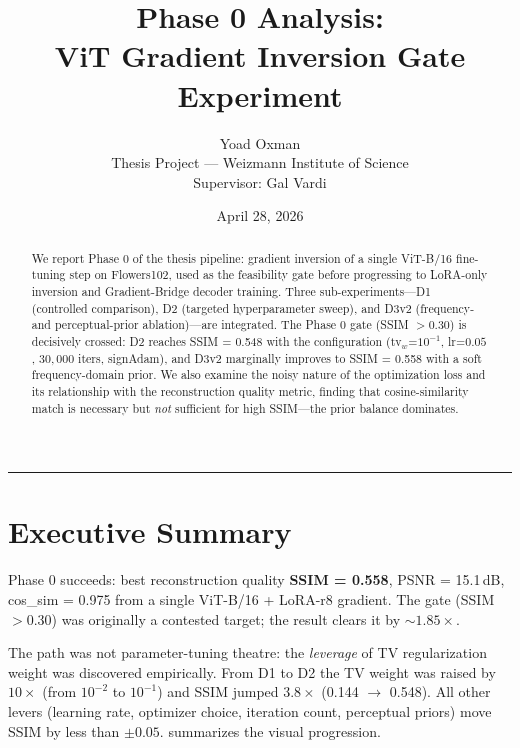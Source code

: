 \documentclass[11pt,a4paper]{article}
\title{\color{accent}\bfseries Phase 0 Analysis:\\ ViT Gradient Inversion Gate Experiment}
\author{Yoad Oxman\\\small Thesis Project --- Weizmann Institute of Science\\\small Supervisor: Gal Vardi}
\date{April 28, 2026}
\begin{document}
\maketitle

\begin{abstract}
\noindent We report Phase 0 of the thesis pipeline: gradient inversion of a single ViT-B/16 fine-tuning step on Flowers102, used as the feasibility gate before progressing to LoRA-only inversion and Gradient-Bridge decoder training. Three sub-experiments---D1 (controlled comparison), D2 (targeted hyperparameter sweep), and D3v2 (frequency- and perceptual-prior ablation)---are integrated. The Phase 0 gate (SSIM $> 0.30$) is decisively crossed: D2 reaches SSIM = 0.548 with the configuration (tv$_w$=$10^{-1}$, lr=$0.05$, $30{,}000$ iters, signAdam), and D3v2 marginally improves to SSIM = 0.558 with a soft frequency-domain prior. We also examine the noisy nature of the optimization loss and its relationship with the reconstruction quality metric, finding that cosine-similarity match is necessary but \emph{not} sufficient for high SSIM---the prior balance dominates.
\end{abstract}

\tableofcontents
\bigskip\hrule\bigskip

\section{Executive Summary}
\label{sec:exec}

\begin{tcolorbox}[colback=good!8,colframe=good!70,arc=2pt,title=\textcolor{good}{\textbf{Gate crossed}}]
Phase 0 succeeds: best reconstruction quality \textbf{SSIM = 0.558}, PSNR = 15.1\,dB, cos\_sim = 0.975 from a single ViT-B/16 + LoRA-r8 gradient. The gate (SSIM $> 0.30$) was originally a contested target; the result clears it by $\sim$$1.85\times$.
\end{tcolorbox}

\noindent The path was not parameter-tuning theatre: the \emph{leverage} of TV regularization weight was discovered empirically. From D1 to D2 the TV weight was raised by $10\times$ (from $10^{-2}$ to $10^{-1}$) and SSIM jumped $3.8\times$ (0.144 $\to$ 0.548). All other levers (learning rate, optimizer choice, iteration count, perceptual priors) move SSIM by less than $\pm 0.05$.  summarizes the visual progression.
\end{document}
